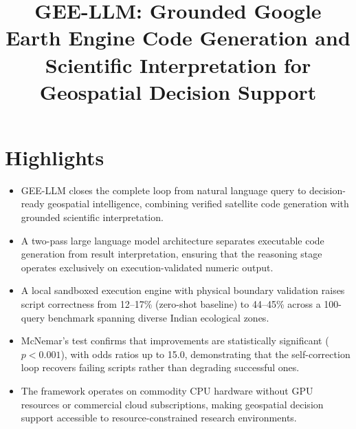 \documentclass[pdflatex,sn-mathphys-ay]{sn-jnl}
\begin{document}
\title[GEE-LLM: Grounded GEE Code Gen and Scientific Interpretation]{GEE-LLM: Grounded Google Earth Engine Code Generation and Scientific Interpretation for Geospatial Decision Support}

\author[1]{ }
\author*[1,2]{ }


\maketitle

\section*{Highlights}
\begin{itemize}
    \item GEE-LLM closes the complete loop from natural language query to decision-ready geospatial intelligence, combining verified satellite code generation with grounded scientific interpretation.
    \item A two-pass large language model architecture separates executable code generation from result interpretation, ensuring that the reasoning stage operates exclusively on execution-validated numeric output.
    \item A local sandboxed execution engine with physical boundary validation raises script correctness from 12--17\% (zero-shot baseline) to 44--45\% across a 100-query benchmark spanning diverse Indian ecological zones.
    \item McNemar's test confirms that improvements are statistically significant ($p < 0.001$), with odds ratios up to 15.0, demonstrating that the self-correction loop recovers failing scripts rather than degrading successful ones.
    \item The framework operates on commodity CPU hardware without GPU resources or commercial cloud subscriptions, making geospatial decision support accessible to resource-constrained research environments.
\end{itemize}
\end{document}
